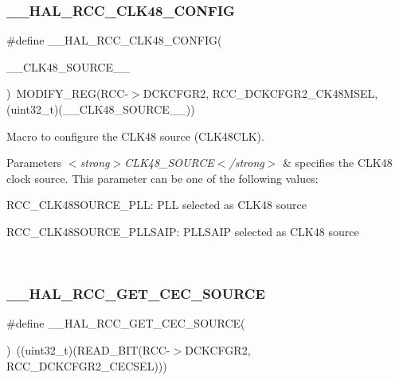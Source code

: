 \subsubsection{\texorpdfstring{\_\_HAL\_RCC\_CLK48\_CONFIG}{\_\_HAL\_RCC\_CLK48\_CONFIG}}
{\footnotesize\ttfamily \#define \+\_\+\+\_\+\+H\+A\+L\+\_\+\+R\+C\+C\+\_\+\+C\+L\+K48\+\_\+\+C\+O\+N\+F\+IG(\begin{DoxyParamCaption}\item[{}]{\+\_\+\+\_\+\+C\+L\+K48\+\_\+\+S\+O\+U\+R\+C\+E\+\_\+\+\_\+ }\end{DoxyParamCaption})~M\+O\+D\+I\+F\+Y\+\_\+\+R\+EG(R\+CC-\/$>$D\+C\+K\+C\+F\+G\+R2, R\+C\+C\+\_\+\+D\+C\+K\+C\+F\+G\+R2\+\_\+\+C\+K48\+M\+S\+EL, (uint32\+\_\+t)(\+\_\+\+\_\+\+C\+L\+K48\+\_\+\+S\+O\+U\+R\+C\+E\+\_\+\+\_\+))}



Macro to configure the C\+L\+K48 source (C\+L\+K48\+C\+LK). 


\begin{DoxyParams}{Parameters}
{\em $<$strong$>$\+C\+L\+K48\+\_\+\+S\+O\+U\+R\+C\+E$<$/strong$>$} & specifies the C\+L\+K48 clock source. This parameter can be one of the following values\+: \begin{DoxyItemize}
\item R\+C\+C\+\_\+\+C\+L\+K48\+S\+O\+U\+R\+C\+E\+\_\+\+P\+LL\+: P\+LL selected as C\+L\+K48 source \item R\+C\+C\+\_\+\+C\+L\+K48\+S\+O\+U\+R\+C\+E\+\_\+\+P\+L\+L\+S\+A\+IP\+: P\+L\+L\+S\+A\+IP selected as C\+L\+K48 source \end{DoxyItemize}
\\
\hline
\end{DoxyParams}
\mbox{\label{group___r_c_c_ex___exported___macros_ga7a636a5c50887bba7270924c3eb6ef2f}} 
\subsubsection{\texorpdfstring{\_\_HAL\_RCC\_GET\_CEC\_SOURCE}{\_\_HAL\_RCC\_GET\_CEC\_SOURCE}}
{\footnotesize\ttfamily \#define \+\_\+\+\_\+\+H\+A\+L\+\_\+\+R\+C\+C\+\_\+\+G\+E\+T\+\_\+\+C\+E\+C\+\_\+\+S\+O\+U\+R\+CE(\begin{DoxyParamCaption}{ }\end{DoxyParamCaption})~((uint32\+\_\+t)(R\+E\+A\+D\+\_\+\+B\+IT(R\+CC-\/$>$D\+C\+K\+C\+F\+G\+R2, R\+C\+C\+\_\+\+D\+C\+K\+C\+F\+G\+R2\+\_\+\+C\+E\+C\+S\+EL)))}



